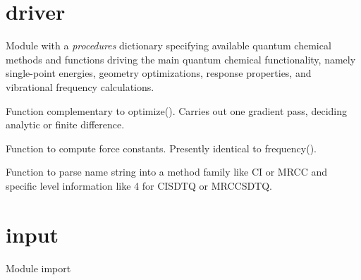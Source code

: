 \documentclass[letterpaper,10pt,english]{sphinxmanual}
\begin{document}
\section{driver}
\label{index:module-driver}\label{index:driver}
Module with a \emph{procedures} dictionary specifying available quantum
chemical methods and functions driving the main quantum chemical
functionality, namely single-point energies, geometry optimizations,
response properties, and vibrational frequency calculations.

\begin{fulllineitems}
\label{index:driver.gradient}
Function complementary to optimize(). Carries out one gradient pass,
deciding analytic or finite difference.

\end{fulllineitems}


\begin{fulllineitems}
\label{index:driver.hessian}
Function to compute force constants. Presently identical to frequency().

\end{fulllineitems}


\begin{fulllineitems}
\label{index:driver.parse_arbitrary_order}
Function to parse name string into a method family like CI or MRCC and specific
level information like 4 for CISDTQ or MRCCSDTQ.

\end{fulllineitems}



\section{input}
\label{index:input}\label{index:module-input}
Module import

\begin{fulllineitems}
\label{index:input.process_input}
\end{fulllineitems}
\end{document}
